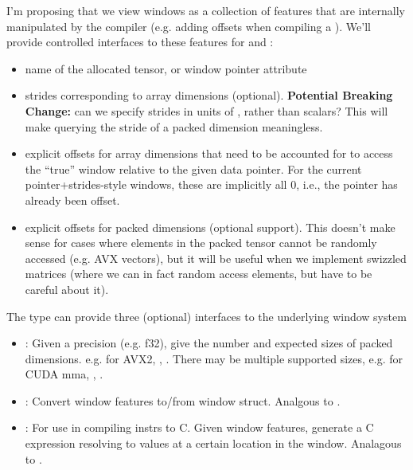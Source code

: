 \filbreak
I'm proposing that we view windows as a collection of features that are internally manipulated by the compiler (e.g. adding offsets when compiling a ).
We'll provide controlled interfaces to these features for  and :
\begin{itemize}
  \item {} name of the allocated tensor, or window  pointer attribute
  \filbreak
  \item {} strides corresponding to array dimensions (optional).
    \textbf{Potential Breaking Change:} can we specify strides in units of , rather than scalars?
    This will make querying the stride of a packed dimension meaningless.
  \filbreak
  \item {} explicit offsets for array dimensions that need to be accounted for to access the ``true'' window relative to the given data pointer. For the current pointer+strides-style windows, these are implicitly all 0, i.e., the  pointer has already been offset.
  \filbreak
  \item {} explicit offsets for packed dimensions (optional support). This doesn't make sense for cases where elements in the packed tensor cannot be randomly accessed (e.g. AVX vectors), but it will be useful when we implement swizzled matrices (where we can in fact random access elements, but have to be careful about it).
\end{itemize}

\filbreak
The  type can provide three (optional) interfaces to the underlying window system
\begin{itemize}
  \item {}: Given a precision (e.g. f32), give the number and expected sizes of packed dimensions. e.g. for AVX2, , . There may be multiple supported sizes, e.g. for CUDA mma, , .
  \item {}: Convert window features to/from window struct. Analgous to .
  \filbreak
  \item {}: For use in compiling instrs to C. Given window features, generate a C expression resolving to values at a certain location in the window. Analagous to .
\end{itemize}

